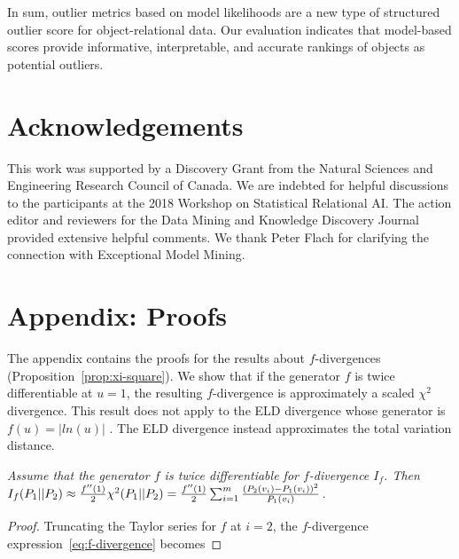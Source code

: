 {								
In sum, outlier metrics based on model likelihoods are a new type of structured outlier score for object-relational data.  Our evaluation indicates that  model-based scores provide informative, interpretable, and accurate rankings of objects as potential outliers. 
								
\section*{Acknowledgements} This work was supported by a Discovery Grant from the Natural Sciences and Engineering Research Council of Canada. We are indebted for helpful discussions to the participants at the 2018 Workshop on Statistical Relational AI. The action editor and reviewers for the Data Mining and Knowledge Discovery Journal provided extensive helpful comments. We thank Peter Flach for clarifying the connection with Exceptional Model Mining. 

\section{Appendix: Proofs} \label{sec:proofs}

The appendix contains the proofs for the results about $f$-divergences (Proposition~\ref{prop:xi-square}). We show that if the generator $f$ is twice differentiable at $u=1$, the resulting $f$-divergence is approximately a scaled $\chi^{2}$ divergence. This result does not apply to the ELD divergence whose generator is $f(u) = |ln(u)|$ . The ELD divergence instead approximates the total variation distance.  

{\em 
Assume that the generator $f$ is twice differentiable for $f$-divergence $I_{f}$. Then $I_{f}(P_{1}||P_{2}) \approx \frac{f''(1)}{2} \chi^{2}(P_{1}||P_{2}) = \frac{f''(1)}{2} 
\sum_{i=1}^{m}  \frac{(P_{2}(v_{i})-P_{1}(v_{i}))^{2}}
 {P_{1}(v_{i})}$. 
}
\begin{proof}

Truncating the Taylor series for $f$ at $i=2$, the $f$-divergence expression~\ref{eq:f-divergence} becomes 


\end{proof}}
